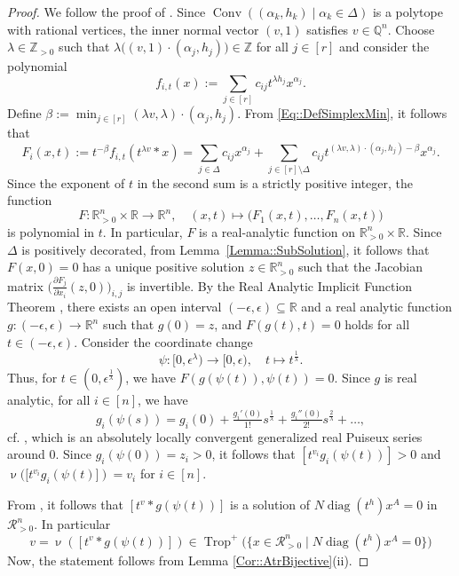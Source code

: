 \documentclass{article}
\theoremstyle{definition}
\DeclareMathOperator{\val}{\nu}
\DeclareMathOperator{\Trop}{Trop}
\DeclareMathOperator{\diag}{diag}
\DeclareMathOperator{\Conv}{Conv}
\begin{document}
\begin{proof}
   We follow the proof of \cite[Theorem 3.4]{PolyhedralMethodSparsePositive}. Since $\Conv( (\alpha_k, h_k) \mid \alpha_k \in \Delta )$ is a polytope with rational vertices, the inner normal vector $(v,1)$ satisfies $v \in \mathbb{Q}^n$. Choose $\lambda \in \mathbb{Z}_{>0}$ such that $\lambda \big( ( v,1)\cdot (\alpha_j,  h_j) \big)\in \mathbb{Z}$ for all $j \in [r]$ and consider the polynomial 
    \[ f_{i,t}(x) := \sum_{j\in [r]} c_{ij}t^{\lambda  h_j}x^{\alpha_j}.\]
    Define $\beta :=  \min_{j \in [r]}  (\lambda v,\lambda) \cdot (\alpha_j, h_j) $. From \eqref{Eq::DefSimplexMin}, it follows that
    \[F_i(x,t) := t^{-\beta} f_{i,t}(t^{\lambda v} \ast x) = \sum_{j \in \Delta } c_{ij}x^{\alpha_j} + \sum_{j \in [r] \setminus \Delta } c_{ij}t^{(\lambda v,\lambda)\cdot (\alpha_j,  h_j) - \beta} x^{\alpha_j}. \]
Since the exponent of $t$ in the second sum is a strictly positive integer, the function
\[ F\colon \mathbb{R}^n_{>0} \times \mathbb{R} \to \mathbb{R}^n, \quad (x,t) \mapsto \big(F_1(x,t),\dots,F_n(x,t)\big)\]
is polynomial in $t$. In particular, $F$ is a real-analytic function on $\mathbb{R}^n_{>0} \times \mathbb{R}$. Since $\Delta$ is positively decorated, from Lemma~\ref{Lemma::SubSolution}, it follows that $F(x,0) = 0$ has a unique positive solution $z \in \mathbb{R}^n_{>0}$ such that the Jacobian matrix $\big(\tfrac{\partial F_j}{\partial x_i}(z,0)\big)_{i,j}$ is invertible. By the Real Analytic Implicit Function Theorem \cite[Theorem 1.8.3]{krantz2002primer}, there exists an open interval $(-\epsilon,\epsilon )\subseteq \mathbb{R}$ and a real analytic function $g\colon (-\epsilon,\epsilon ) \to \mathbb{R}^n$ such that $g(0) = z$, and $F(g(t),t) = 0$ holds for all $t \in (-\epsilon,\epsilon )$.  Consider the coordinate change
\[ \psi\colon [0,\epsilon^{\lambda}) \to [0,\epsilon), \quad t \mapsto t^{\tfrac{1}{\lambda}}. \]
Thus, for  $t \in (0,\epsilon^{\tfrac{1}{\lambda}})$, we have $F(g(\psi(t)),\psi(t)) = 0$. Since $g$ is real analytic, for all $i \in [n]$, we have
    \[ g_i(\psi(s)) = g_i(0) + \tfrac{g_i'(0)}{1!} s^{\tfrac{1}{\lambda}} + \tfrac{g_i''(0)}{2!}s^{\tfrac{2}{\lambda}}+ \dots ,\]
    cf. \cite[Corollary 1.1.10]{krantz2002primer}, which is an absolutely locally convergent generalized real Puiseux series around $0$. Since $g_i(\psi(0)) = z_i > 0$, it follows that $[t^{ v_i} g_i(\psi(t)) ]>0$ and $\val([t^{ v_i} g_i(\psi(t) ]) = v_i$ for $i \in[n]$.  
    
From \cite[Proposition 5.9]{Coste::oMinimal}, it follows that $[t^{v} \ast g(\psi(t))]$ is a solution of $N \diag( t^{ h}) x^A = 0$ in $\mathcal{R}_{>0}^n$. In particular
  \[  v = \val([t^{v } \ast g(\psi(t))]) \in   \Trop^+\big( \big\{ x \in \mathcal{R}_{>0}^n \mid N \diag( t^{ h}) x^A = 0 \big\} \big) \]
    Now, the statement follows from Lemma \ref{Cor::AtrBijective}(ii). 
\end{proof}
\end{document}
